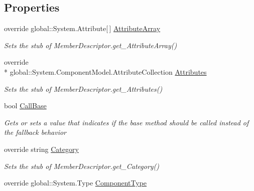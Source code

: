 \subsection*{Properties}
\begin{DoxyCompactItemize}
\item 
override global\-::\-System.\-Attribute\mbox{[}$\,$\mbox{]} \hyperlink{class_system_1_1_component_model_1_1_fakes_1_1_stub_property_descriptor_affe1c4f1b4240efd9e5ba8fbd65c3b4c}{Attribute\-Array}
\begin{DoxyCompactList}\small\item\em Sets the stub of Member\-Descriptor.\-get\-\_\-\-Attribute\-Array()\end{DoxyCompactList}\item 
override \\*
global\-::\-System.\-Component\-Model.\-Attribute\-Collection \hyperlink{class_system_1_1_component_model_1_1_fakes_1_1_stub_property_descriptor_a21bcc47ae05a39ca32eb9bc8518d2b00}{Attributes}
\begin{DoxyCompactList}\small\item\em Sets the stub of Member\-Descriptor.\-get\-\_\-\-Attributes()\end{DoxyCompactList}\item 
bool \hyperlink{class_system_1_1_component_model_1_1_fakes_1_1_stub_property_descriptor_aa521fae0a88609f188e57839853d924d}{Call\-Base}
\begin{DoxyCompactList}\small\item\em Gets or sets a value that indicates if the base method should be called instead of the fallback behavior\end{DoxyCompactList}\item 
override string \hyperlink{class_system_1_1_component_model_1_1_fakes_1_1_stub_property_descriptor_a8adc0cb913f78591db04c589a0d7d7c0}{Category}
\begin{DoxyCompactList}\small\item\em Sets the stub of Member\-Descriptor.\-get\-\_\-\-Category()\end{DoxyCompactList}\item 
override global\-::\-System.\-Type \hyperlink{class_system_1_1_component_model_1_1_fakes_1_1_stub_property_descriptor_a6dd265982257e42fdb9ef191ee15269c}{Component\-Type}

\end{DoxyCompactItemize}
